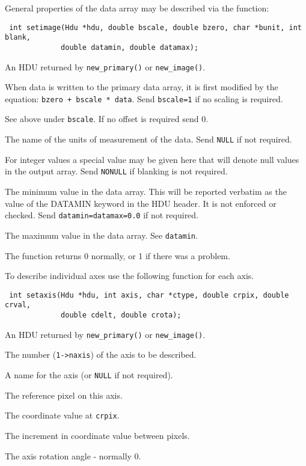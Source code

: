 General properties of the data array may be described via the
function:
\label{setimage}\begin{verbatim}
 int setimage(Hdu *hdu, double bscale, double bzero, char *bunit, int blank,
             double datamin, double datamax);
\end{verbatim}
\begin{arglist}

 An HDU returned by \verb`new_primary()` or
                  \verb`new_image()`.

 When data is written to the primary data array, it is
             first modified by the equation: \verb`bzero + bscale * data`.
             Send \verb`bscale=1` if no scaling is required.

  See above under \verb`bscale`. If no offset is
                     required send 0. 

  The name of the units of measurement of the data. Send
             \verb`NULL` if not required.

  For integer values a special value may be given here that
             will denote null values in the output array. Send \verb`NONULL`
             if blanking is not required.

 The minimum value in the data array. This will
             be reported verbatim as the value of the DATAMIN keyword in the
             HDU header. It is not enforced or checked.
             Send \verb`datamin=datamax=0.0` if not required.

 The maximum value in the data array. See \verb`datamin`.
\end{arglist}

The function returns 0 normally, or 1 if there was a problem.

To describe individual axes use the following function for each axis.
\label{setaxis}\begin{verbatim}
 int setaxis(Hdu *hdu, int axis, char *ctype, double crpix, double crval,
             double cdelt, double crota);
\end{verbatim}
\begin{arglist}

 An HDU returned by \verb`new_primary()` or \verb`new_image()`.

 The number (\verb`1->naxis`) of the axis to be described.

  A name for the axis (or \verb`NULL` if not required).

  The reference pixel on this axis.

  The coordinate value at \verb`crpix`.

  The increment in coordinate value between pixels.

  The axis rotation angle - normally 0.
\end{arglist}

